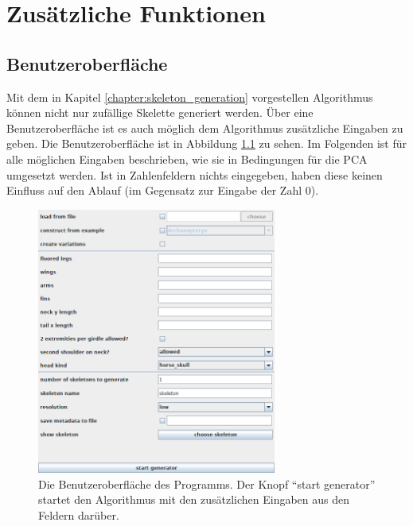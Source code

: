 \chapter{Zusätzliche Funktionen}
\label{chapter:additional_features}


\section{Benutzeroberfläche}
\label{gui}

Mit dem in Kapitel \ref{chapter:skeleton_generation} vorgestellen Algorithmus können nicht nur zufällige Skelette generiert werden. Über eine Benutzeroberfläche ist es auch möglich dem Algorithmus zusätzliche Eingaben zu geben. Die Benutzeroberfläche ist in Abbildung \ref{gui_screenshot} zu sehen.
Im Folgenden ist für alle möglichen Eingaben beschrieben, wie sie in Bedingungen für die PCA umgesetzt werden. Ist in Zahlenfeldern nichts eingegeben, haben diese keinen Einfluss auf den Ablauf (im Gegensatz zur Eingabe der Zahl $0$).

\begin{figure}
 \centering
 \includegraphics[width=0.7\textwidth]{graphics/gui.png}
 \caption{Die Benutzeroberfläche des Programms. Der Knopf "`start generator"' startet den Algorithmus mit den zusätzlichen Eingaben aus den Feldern darüber.}
 \label{gui_screenshot}
\end{figure}

